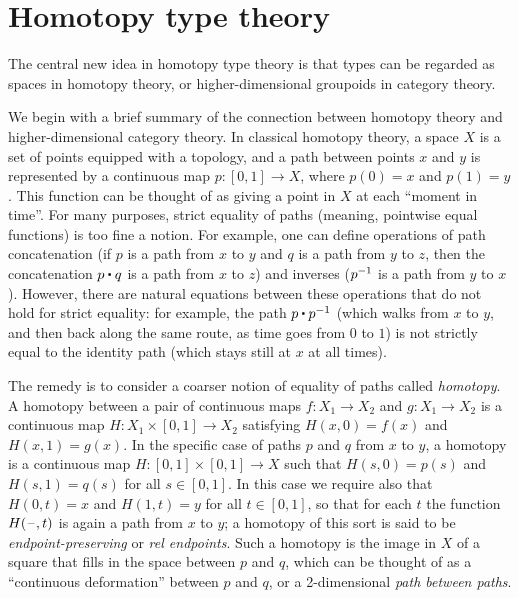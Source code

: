 \chapter{Homotopy type theory}
\label{cha:basics}

The central new idea in homotopy type theory is that types can be regarded as
spaces in homotopy theory, or higher-dimensional groupoids in category
theory.  

We begin with a brief summary of the connection between homotopy theory
and higher-dimensional category theory.  
In classical homotopy theory, a space $X$ is a set of points equipped
with a topology,
and a path between points $x$ and $y$ is represented by
a continuous map $p : [0,1] \to X$, where $p(0) = x$ and $p(1) = y$.
This function can be thought of as giving a point in $X$ at each
``moment in time''.  For many purposes, strict equality of paths
(meaning, pointwise equal functions) is too fine a notion.  For example,
one can define operations of path concatenation (if $p$ is a path from
$x$ to $y$ and $q$ is a path from $y$ to $z$, then the concatenation $p
\ct q$ is a path from $x$ to $z$) and inverses ($\mathord{{p}^{-1}}$ is a path
from $y$ to $x$).  However, there are natural equations between these
operations that do not hold for strict equality: for example, the path
$p \ct \opp p$ (which walks from $x$ to $y$, and then back along the
same route, as time goes from $0$ to $1$) is not strictly equal to the
identity path (which stays still at $x$ at all times).

The remedy is to consider a coarser notion of equality of paths called
\emph{homotopy}.
A homotopy between a pair of continuous maps $f :
X_1 \to X_2$ and $g : X_1\to X_2$ is a continuous map $H : X_1
\times [0, 1] \to X_2$ satisfying $H(x, 0) = f (x)$ and $H(x, 1) =
g(x)$.  In the specific case of paths $p$ and $q$ from $x$ to $y$, a homotopy is a
continuous map $H : [0,1] \times [0,1] \rightarrow X$
such that $H(s,0) = p(s)$ and $H(s,1) = q(s)$ for all $s\in [0,1]$.
In this case we require also that $H(0,t) = x$ and $H(1,t)=y$ for all $t\in [0,1]$,
so that for each $t$ the function $H(\mathord{\hspace{1pt}\text{--}\hspace{1pt}},t)$ is again a path from $x$ to $y$;
a homotopy of this sort is said to be \emph{endpoint-preserving} or \emph{rel endpoints}.
Such a homotopy is the
image in $X$ of a square that fills in the space between $p$ and $q$,
which can be thought of as a ``continuous deformation'' between $p$ and
$q$, or a 2-dimensional \emph{path between paths}.

